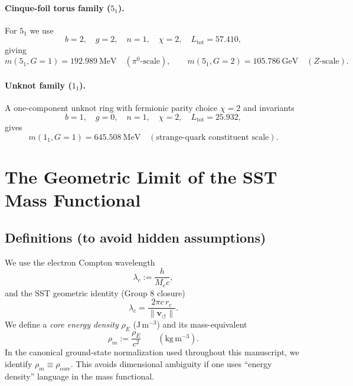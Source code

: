 \documentclass[11pt, a4paper]{article}
\newcommand{\vswirl}{\mathbf{v}_{\!\boldsymbol{\circlearrowleft}}}
\newcommand{\rhocore}{\rho_{\text{core}}}
\newcommand{\rhoE}{\rho_{\!E}}
\newcommand{\rhom}{\rho_{\!m}}
\newcommand{\rc}{r_c}
\newcommand{\Ltot}{L_{\text{tot}}}
\begin{document}
                \paragraph{Cinque-foil torus family ($5_1$).}
                    For $5_1$ we use
                    \[
                        b=2,\quad g=2,\quad n=1,\quad \chi=2,\quad \Ltot=57.410,
                    \]
                    giving
                    \[
                        m(5_1,G=1)=192.989~\mathrm{MeV}\quad (\pi^0\text{-scale}),\qquad
                        m(5_1,G=2)=105.786~\mathrm{GeV}\quad (Z\text{-scale}).
                    \]
                
                \paragraph{Unknot family ($1_1$).}
                    A one-component unknot ring with fermionic parity choice \(\chi=2\) and invariants
                    \[
                        b=1,\quad g=0,\quad n=1,\quad \chi=2,\quad \Ltot=25.932,
                    \]
                    gives
                    \[
                        m(1_1,G=1)=645.508~\mathrm{MeV}\quad (\text{strange-quark constituent scale}).
                    \]

        \section{The Geometric Limit of the SST Mass Functional}
        \label{sec:geom_limit}
        
        \subsection{Definitions (to avoid hidden assumptions)}
            We use the electron Compton wavelength
            \begin{equation}
                \lambda_c := \frac{h}{M_e c},
            \end{equation}
            and the SST geometric identity (Group 8 closure)
            \begin{equation}
                \lambda_c = \frac{2\pi c\, \rc}{\lVert \vswirl \rVert}.
                \label{eq:lc_geom}
            \end{equation}
            We define a \emph{core energy density} $\rhoE$ (J\,m$^{-3}$) and its mass-equivalent
            \begin{equation}
                \rhom := \frac{\rhoE}{c^2}\qquad (\mathrm{kg\,m^{-3}}).
            \end{equation}
            In the canonical ground-state normalization used throughout this manuscript, we identify $\rhom\equiv \rhocore$.
            This avoids dimensional ambiguity if one uses ``energy density'' language in the mass functional.
        
\end{document}

